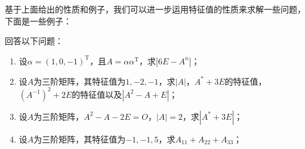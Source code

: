 
基于上面给出的性质和例子，我们可以进一步运用特征值的性质来求解一些问题，下面是一些例子：
\begin{example}{}{}
    回答以下问题：
    \begin{enumerate}
        \item 设$\alpha=(1,0,-1)^\mathrm{T}$，且$A=\alpha\alpha^\mathrm{T}$，求$|6E-A^n|$；

        \item 设$A$为三阶矩阵，其特征值为$1,-2,-1$，求$|A|$，$A^*+3E$的特征值，$(A^{-1})^2+2E$的特征值以及$|A^2-A+E|$；

        \item 设$A$为三阶矩阵，$A^2-A-2E=O$，$|A|=2$，求$|A^*+3E|$；

        \item 设$A$为三阶矩阵，其特征值为$-1,-1,5$，求$A_{11}+A_{22}+A_{33}$；
    \end{enumerate}
\end{example}

